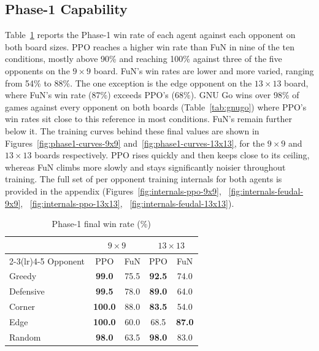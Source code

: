 \documentclass[sigconf,nonacm]{acmart}
\begin{document}
\subsection{Phase-1 Capability}
Table~\ref{tab:phase1} reports the Phase-1 win rate of each agent against each
opponent on both board sizes. PPO reaches a higher win rate than FuN in nine of
the ten conditions, mostly above 90\% and reaching 100\% against three of the
five opponents on the $9\times9$ board. FuN's win rates are lower and more
varied, ranging from 54\% to 88\%. The one exception is the edge opponent on the
$13\times13$ board, where FuN's win rate (87\%) exceeds PPO's (68\%). GNU Go wins over 98\% of games against every opponent on both boards (Table~\ref{tab:gnugo}) where PPO's win rates sit close to
this reference in most conditions. FuN's remain further below it. The training curves behind these final values are shown in Figures~\ref{fig:phase1-curves-9x9} and~\ref{fig:phase1-curves-13x13}, for the $9\times9$ and $13\times13$ boards respectively. PPO rises quickly and then keeps close to its ceiling, whereas FuN climbs more slowly and stays significantly noisier throughout training. The full set of per opponent training internals for both agents is provided in the appendix (Figures~\ref{fig:internals-ppo-9x9}, ~\ref{fig:internals-feudal-9x9}, ~\ref{fig:internals-ppo-13x13}, ~\ref{fig:internals-feudal-13x13}).

\begin{table}[H]
  \centering
  \caption{Phase-1 final win rate (\%)}
  \label{tab:phase1}
  \small
  \renewcommand{\arraystretch}{0.6}
  \begin{tabular}{@{}l cc cc@{}}
    \toprule
    & \multicolumn{2}{c}{$9\times9$} & \multicolumn{2}{c}{$13\times13$} \\
    \cmidrule(lr){2-3}\cmidrule(lr){4-5}
    Opponent & PPO & FuN & PPO & FuN \\
    \midrule
    Greedy & \textbf{99.0} & 75.5 & \textbf{92.5} & 74.0 \\
    Defensive & \textbf{99.5} & 78.0 & \textbf{89.0} & 64.0 \\
    Corner & \textbf{100.0} & 88.0 & \textbf{83.5} & 54.0 \\
    Edge & \textbf{100.0} & 60.0 & 68.5 & \textbf{87.0} \\
    Random & \textbf{98.0} & 63.5 & \textbf{98.0} & 83.0 \\
    \bottomrule
  \end{tabular}
\end{table}
\end{document}
